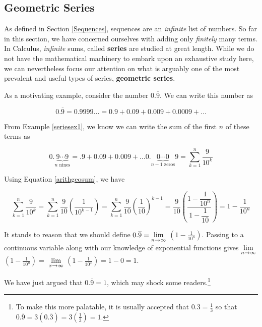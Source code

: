\subsection{Geometric Series}
\label{GeometricSeries}

As defined in Section \ref{Sequences}, sequences are an \textit{infinite} list of numbers.  So far in this section, we have concerned ourselves with adding only \textit{finitely} many terms.   In Calculus,  \textit{infinite} sums, called \textbf{series} are studied at great length.  While we do not have the mathematical machinery to embark upon an exhaustive study here, we can nevertheless focus our attention on what is arguably one of the most prevalent and useful types of series, \textbf{geometric series}.

As a motivating example, consider the number $0.\overline{9}$.  We can write this number as

\[ 0.\overline{9} = 0.9999... = 0.9 + 0.09 + 0.009 + 0.0009 + \ldots \]


From Example \ref{seriesex1}, we know we can write the sum of the first $n$ of these terms as 

\[ 0.\underbrace{9 \cdots 9}_{\text{$n$ nines}} = .9 + 0.09 + 0.009 + \ldots 0.\! \! \! \! \underbrace{0 \cdots 0}_{\text{$n-1$ zeros}} \! \! \! \! 9 = \displaystyle{\sum_{k=1}^{n} \dfrac{9}{10^{k}}} \]

Using Equation \ref{arithgeosum}, we have


\[\displaystyle{\sum_{k=1}^{n} \dfrac{9}{10^{k}}} = \sum_{k=1}^{n} \dfrac{9}{10} \left(\dfrac{1}{10^{k-1}}\right) = \sum_{k=1}^{n} \dfrac{9}{10} \left(\dfrac{1}{10}\right)^{k-1} =  \dfrac{9}{10} \left( \dfrac{1 - \dfrac{1}{10^{n}}}{1 - \dfrac{1}{10}} \right) = 1 - \dfrac{1}{10^{n}}   \]

It stands to reason that we should define $0.\overline{9} = \displaystyle{\lim_{n \rightarrow \infty}}$ $\left(1 - \frac{1}{10^{n}}\right)$.  Passing to a continuous variable along with our knowledge of exponential functions  gives  $\displaystyle{\lim_{n \rightarrow \infty}}$ $\left(1 - \frac{1}{10^{n}} \right) =$ $\displaystyle{\lim_{x \rightarrow \infty}}$ $\left(1 - \frac{1}{10^{x}} \right) = 1 - 0 = 1$.

\medskip

We have just argued that $0.\overline{9} = 1$, which may shock some readers.\footnote{To make this more palatable, it is usually accepted that $0.\overline{3} = \frac{1}{3}$ so that $0.\overline{9} = 3\left(0.\overline{3}\right) = 3\left(\frac{1}{3} \right) = 1$.}  

